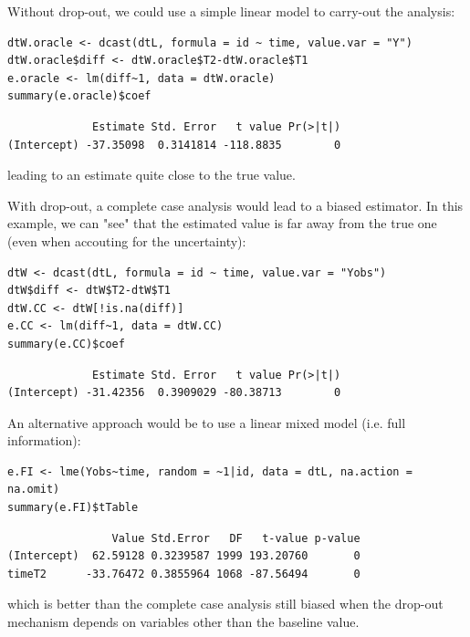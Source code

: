 \documentclass[12pt]{article}
\begin{document}
\bigskip

Without drop-out, we could use a simple linear model to carry-out the analysis:
\lstset{language=r,label= ,caption= ,captionpos=b,numbers=none}
\begin{lstlisting}
dtW.oracle <- dcast(dtL, formula = id ~ time, value.var = "Y")
dtW.oracle$diff <- dtW.oracle$T2-dtW.oracle$T1
e.oracle <- lm(diff~1, data = dtW.oracle)
summary(e.oracle)$coef
\end{lstlisting}

\begin{verbatim}
             Estimate Std. Error   t value Pr(>|t|)
(Intercept) -37.35098  0.3141814 -118.8835        0
\end{verbatim}

leading to an estimate quite close to the true value.

\bigskip

With drop-out, a complete case analysis would lead to a biased
estimator. In this example, we can "see" that the estimated value is
far away from the true one (even when accouting for the uncertainty):
\lstset{language=r,label= ,caption= ,captionpos=b,numbers=none}
\begin{lstlisting}
dtW <- dcast(dtL, formula = id ~ time, value.var = "Yobs")
dtW$diff <- dtW$T2-dtW$T1
dtW.CC <- dtW[!is.na(diff)]
e.CC <- lm(diff~1, data = dtW.CC)
summary(e.CC)$coef
\end{lstlisting}

\begin{verbatim}
             Estimate Std. Error   t value Pr(>|t|)
(Intercept) -31.42356  0.3909029 -80.38713        0
\end{verbatim}


An alternative approach would be to use a linear mixed model
(i.e. full information):
\lstset{language=r,label= ,caption= ,captionpos=b,numbers=none}
\begin{lstlisting}
e.FI <- lme(Yobs~time, random = ~1|id, data = dtL, na.action = na.omit)
summary(e.FI)$tTable
\end{lstlisting}

\begin{verbatim}
                Value Std.Error   DF   t-value p-value
(Intercept)  62.59128 0.3239587 1999 193.20760       0
timeT2      -33.76472 0.3855964 1068 -87.56494       0
\end{verbatim}

which is better than the complete case analysis still biased when the
drop-out mechanism depends on variables other than the baseline value.
\end{document}
